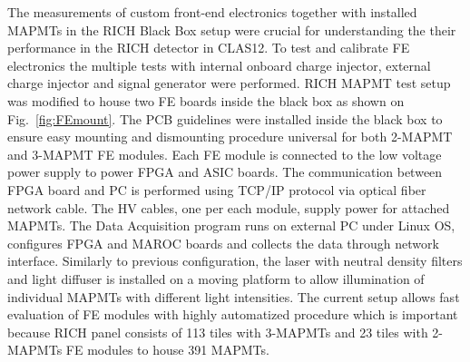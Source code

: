 
The measurements of custom front-end electronics together with installed MAPMTs in the RICH Black Box setup were crucial for understanding the their performance in the RICH detector in CLAS12.
To test and calibrate FE electronics the multiple tests with internal onboard charge injector, external charge injector and signal generator were performed.
RICH MAPMT test setup was modified to house two FE boards inside the black box as shown on Fig.~\ref{fig:FEmount}.
The PCB guidelines were installed inside the black box to ensure easy mounting and dismounting procedure universal for both 2-MAPMT and 3-MAPMT FE modules.
Each FE module is connected to the low voltage power supply to power FPGA and ASIC boards.
The communication between FPGA board and PC is performed using TCP/IP protocol via optical fiber network cable.
The HV cables, one per each module, supply power for attached MAPMTs.
The Data Acquisition program runs on external PC under Linux OS, configures FPGA and MAROC boards and collects the data through network interface.
Similarly to previous configuration, the laser with neutral density filters and light diffuser is installed on a moving platform to allow illumination of individual MAPMTs with different light intensities.
The current setup allows fast evaluation of FE modules with highly automatized procedure which is important because RICH panel consists of 113 tiles with 3-MAPMTs and 23 tiles with 2-MAPMTs FE modules to house 391 MAPMTs.


